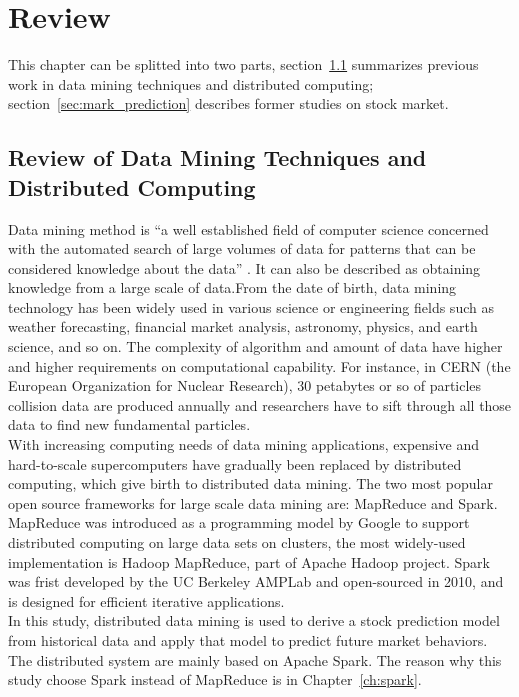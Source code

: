 \chapter{Review}
\label{ch:review}

This chapter can be splitted into two parts, section~\ref{sec:dm_dc} summarizes previous work in data mining techniques and distributed computing; section~\ref{sec:mark_prediction} describes former studies on stock market.

\section{Review of Data Mining Techniques and Distributed Computing}
\label{sec:dm_dc}
Data mining method is ``a well established field of computer science concerned with the automated search of large volumes of data for patterns that can be considered knowledge about the data'' \cite{dubitzky2008data}. It can also be described as obtaining knowledge from a large scale of data.From the date of birth, data mining technology has been widely used in various science or engineering fields such as weather forecasting, financial market analysis, astronomy, physics, and earth science, and so on. The complexity of algorithm and amount of data have higher and higher requirements on computational capability. For instance, in CERN (the European Organization for Nuclear Research), 30 petabytes or so of particles collision data are produced annually and researchers have to sift through all those data to find new fundamental particles.\cite{O'Luanaigh:1997391}\\ 


With increasing computing needs of data mining applications, expensive and hard-to-scale supercomputers have gradually been replaced by distributed computing, which give birth to distributed data mining. The two most popular open source frameworks for large scale data mining are: MapReduce and Spark. MapReduce was introduced as a programming model by Google to support distributed computing on large data sets on clusters, the most widely-used implementation is Hadoop MapReduce, part of Apache Hadoop project\cite{sammer2012hadoop}. Spark was frist developed by the UC Berkeley AMPLab and open-sourced in 2010, and is designed for efficient iterative applications\cite{meng2016mllib}.\\

In this study, distributed data mining is used to derive a stock prediction model from historical data and apply that model to predict future market behaviors. The distributed system are mainly based on Apache Spark. The reason why this study choose Spark instead of MapReduce is in Chapter~\ref{ch:spark}.\\
 

